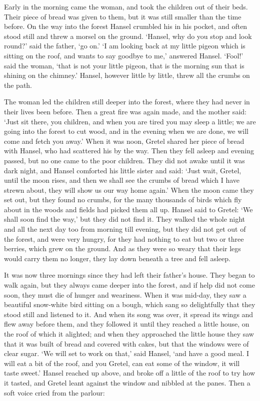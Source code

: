 \documentclass[oneside,11pt]{memoir} %
\begin{document}
Early in the morning came the woman, and took the children out of their beds. Their piece of bread was given to them, but it was still smaller than the time before. On the way into the forest Hansel crumbled his in his pocket, and often stood still and threw a morsel on the ground. `Hansel, why do you stop and look round?' said the father, `go on.' `I am looking back at my little pigeon which is sitting on the roof, and wants to say goodbye to me,' answered Hansel. `Fool!' said the woman, `that is not your little pigeon, that is the morning sun that is shining on the chimney.' Hansel, however little by little, threw all the crumbs on the path.

The woman led the children still deeper into the forest, where they had never in their lives been before. Then a great fire was again made, and the mother said: `Just sit there, you children, and when you are tired you may sleep a little; we are going into the forest to cut wood, and in the evening when we are done, we will come and fetch you away.' When it was noon, Gretel shared her piece of bread with Hansel, who had scattered his by the way. Then they fell asleep and evening passed, but no one came to the poor children. They did not awake until it was dark night, and Hansel comforted his little sister and said: `Just wait, Gretel, until the moon rises, and then we shall see the crumbs of bread which I have strewn about, they will show us our way home again.' When the moon came they set out, but they found no crumbs, for the many thousands of birds which fly about in the woods and fields had picked them all up. Hansel said to Gretel: `We shall soon find the way,' but they did not find it. They walked the whole night and all the next day too from morning till evening, but they did not get out of the forest, and were very hungry, for they had nothing to eat but two or three berries, which grew on the ground. And as they were so weary that their legs would carry them no longer, they lay down beneath a tree and fell asleep.

It was now three mornings since they had left their father's house. They began to walk again, but they always came deeper into the forest, and if help did not come soon, they must die of hunger and weariness. When it was mid-day, they saw a beautiful snow-white bird sitting on a bough, which sang so delightfully that they stood still and listened to it. And when its song was over, it spread its wings and flew away before them, and they followed it until they reached a little house, on the roof of
which it alighted; and when they approached the little house they saw that it was built of bread and covered with cakes, but that the windows were of clear sugar. `We will set to work on that,' said Hansel, `and have a good meal. I will eat a bit of the roof, and you Gretel, can eat some of the window, it will taste sweet.' Hansel reached up above, and broke off a little of the roof to try how it tasted, and Gretel leant against the window and nibbled at the panes. Then a soft voice cried
from the parlour:
\end{document}
